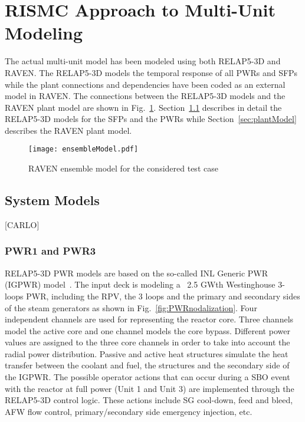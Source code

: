 \section{RISMC Approach to Multi-Unit Modeling}
\label{sec:RISMC_MU_modeling}

The actual multi-unit model has been modeled using both RELAP5-3D and RAVEN.
The RELAP5-3D models the temporal response of all PWRs and SFPs while the plant 
connections and dependencies have been coded as an external model in RAVEN.
The connections between the RELAP5-3D models and the RAVEN plant model are 
shown in Fig.~\ref{fig:ensembleModel}.
Section~\ref{sec:systemModels} describes in detail the RELAP5-3D models for 
the SFPs and the PWRs while Section~\ref{sec:plantModel} describes the RAVEN plant model.
 
\begin{figure}
    \centering
    \texttt{[image: ensembleModel.pdf]}
    \caption{RAVEN ensemble model for the considered test case}
    \label{fig:ensembleModel}
\end{figure}

\subsection{System Models}
\label{sec:systemModels}
[CARLO]
\subsubsection{PWR1 and PWR3}
RELAP5-3D PWR models are based on the so-called INL Generic PWR (IGPWR) 
model~\cite{parisiExternalHazard,ronaldoRISMC}. 
The input deck is modeling a ~2.5 GWth Westinghouse 3-loops PWR, including the RPV,
the 3 loops and the primary and secondary sides of the steam 
generators as shown in Fig.~\ref{fig:PWRnodalization}.
Four independent channels are used for representing the reactor core. Three channels model 
the active core and one channel models the core bypass. Different power values are assigned 
to the three core channels in order to take into account the radial power distribution. 
Passive and active heat structures simulate the heat transfer between the coolant and fuel, 
the structures and the secondary side of the IGPWR.
The possible operator actions that can occur during a SBO event with 
the reactor at full power (Unit 1 and Unit 3) are implemented through the RELAP5-3D control 
logic. These actions include SG cool-down, feed and bleed, AFW flow control, primary/secondary 
side emergency injection, etc.

